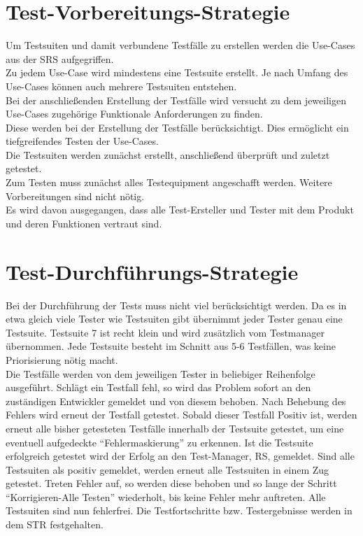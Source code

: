 \chapter{Test-Vorbereitungs-Strategie}
Um Testsuiten und damit verbundene Testfälle zu erstellen werden die Use-Cases aus der SRS aufgegriffen.\\
Zu jedem Use-Case wird mindestens eine Testsuite erstellt. Je nach Umfang des Use-Cases können auch mehrere Testsuiten entstehen.\\
Bei der anschließenden Erstellung der Testfälle wird versucht zu dem jeweiligen Use-Cases zugehörige Funktionale Anforderungen zu finden.\\
Diese werden bei der Erstellung der Testfälle berücksichtigt. Dies ermöglicht ein tiefgreifendes Testen der Use-Cases.\\
\newline
Die Testsuiten werden zunächst erstellt, anschließend überprüft und zuletzt getestet.\\
Zum Testen muss zunächst alles Testequipment angeschafft werden. Weitere Vorbereitungen sind nicht nötig.\\
Es wird davon ausgegangen, dass alle Test-Ersteller und Tester mit dem Produkt und deren Funktionen vertraut sind.

\chapter{Test-Durchführungs-Strategie}
Bei der Durchführung der Tests muss nicht viel berücksichtigt werden.
Da es in etwa gleich viele Tester wie Testsuiten gibt übernimmt jeder Tester genau eine Testsuite. Testsuite 7 ist recht klein und wird zusätzlich vom Testmanager übernommen.
Jede Testsuite besteht im Schnitt aus 5-6 Testfällen, was keine Priorisierung nötig macht.\\
Die Testfälle werden von dem jeweiligen Tester in beliebiger Reihenfolge ausgeführt. Schlägt ein Testfall fehl, so wird das Problem sofort
an den zuständigen Entwickler gemeldet und von diesem behoben. Nach Behebung des Fehlers wird erneut der Testfall getestet.
Sobald dieser Testfall Positiv ist, werden erneut alle bisher getesteten Testfälle innerhalb der Testsuite getestet, um
eine eventuell aufgedeckte "`Fehlermaskierung"' zu erkennen. Ist die Testsuite erfolgreich getestet wird der Erfolg an den Test-Manager, RS,
gemeldet. Sind alle Testsuiten als positiv gemeldet, werden erneut alle Testsuiten in einem Zug getestet. Treten Fehler auf,
so werden diese behoben und so lange der Schritt "`Korrigieren-Alle Testen"' wiederholt, bis keine Fehler mehr auftreten.
Alle Testsuiten sind nun fehlerfrei. Die Testfortschritte bzw. Testergebnisse werden in dem STR festgehalten.

